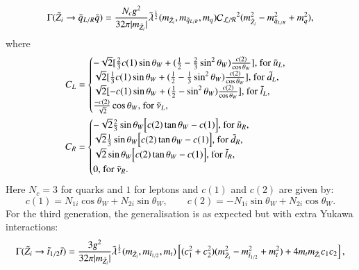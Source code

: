 \documentclass[final,3p,times,pdflatex]{elsarticle}
\begin{document}
\begin{equation} \label{neutqLRqNMSSM}
\Gamma(\tilde{Z}_i \rightarrow \tilde{q}_{L/R} \bar{q}) = {N_{c} g^2 \over 32 \pi |m_{\tilde{Z}_i}|} \tilde{\lambda}^{1 \over 2}(m_{\tilde{Z}_i},m_{\tilde{q}_{L/R}}, m_{q}) \mathcal{C_{L/R}}^2 (m_{\tilde{Z}_i}^2 - m_{\tilde{q}_{L/R}}^2 + m_{q}^2),
\end{equation}
where
\begin{align}
C_{L} &= \begin{cases}
		-\sqrt{2}[{2 \over 3} c(1) \sin\theta_W + ({1 \over 2} - {2 \over 3}\sin^2 \theta_W) {c(2) \over \cos\theta_W}] $, for $\tilde{u}_L$,$ \\
		\sqrt{2}[{1 \over 3} c(1) \sin\theta_W + ({1 \over 2} - {1 \over 3}\sin^2 \theta_W) {c(2) \over \cos\theta_W}] $, for $\tilde{d}_L$,$ \\
		\sqrt{2}[-c(1) \sin\theta_W + ({1 \over 2} - \sin^2 \theta_W) {c(2) \over \cos\theta_W}] $, for $\tilde{l}_L$,$ \\
 		{-c(2) \over \sqrt{2}} \cos\theta_W $, for $\tilde{\nu}_L$,$ \\
 		\end{cases} \\
C_{R} &= \begin{cases}
		-\sqrt{2}{2 \over 3} \sin\theta_W \Big[c(2) \tan\theta_W - c(1)\Big] $, for $\tilde{u}_R $,$\\
		\sqrt{2}{1 \over 3} \sin\theta_W \Big[c(2) \tan\theta_W - c(1)\Big] $, for $\tilde{d}_R $,$\\
		\sqrt{2} \sin\theta_W \Big[c(2) \tan\theta_W - c(1)\Big] $, for $\tilde{l}_R $,$\\
		0 $, for $\tilde{\nu}_R.\\
 		\end{cases}
\end{align}
Here $N_{c} = 3$ for quarks and $1$ for leptons and $c(1)$ and $c(2)$ are given by:
\begin{equation} \label{C1C2NMSSM}
c(1) = N_{1i}\cos\theta_W + N_{2i}\sin\theta_W, \quad \quad 
c(2) = -N_{1i} \sin\theta_W + N_{2i}\cos\theta_W.
\end{equation}
For the third generation, the generalisation is as expected but with extra Yukawa interactions:
\begin{equation} \label{neutsttNMSSM}
\Gamma(\tilde{Z}_i \rightarrow \tilde{t}_{1/2} \bar{t}) = {3 g^2 \over 32\pi |m_{\tilde{Z}_i}|} \tilde{\lambda}^{1 \over 2}(m_{\tilde{Z}_i},m_{\tilde{t}_{1/2}}, m_{t})\left[(c_{1}^2 + c_{2}^2)(m_{\tilde{Z}_i}^2 - m_{\tilde{t}_{1/2}}^2 + m_{t}^2) + 4m_{t}m_{\tilde{Z}_i}c_{1}c_{2}\right],
\end{equation}
\end{document}
